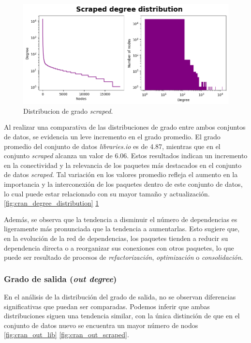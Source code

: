 \begin{figure}[h!]
    \begin{center}
        \includegraphics[width=1\textwidth]{img/cran/distribucion_grado2.png}
        \caption{Distribucion de grado \textit{scraped}.}
        \label{fig:cran_degree_distribution_scraped}
    \end{center}
\end{figure}

Al realizar una comparativa de las distribuciones de grado entre ambos conjuntos de datos,
se evidencia un leve incremento en el grado promedio. El grado promedio del conjunto de datos
\textit{libraries.io} es de 4.87, mientras que en el conjunto \textit{scraped} alcanza un valor
de 6.06. Estos resultados indican un incremento en la conectividad y la relevancia de los
paquetes más destacados en el conjunto de datos \textit{scraped}. Tal variación en los valores
promedio refleja el aumento en la importancia y la interconexión de los paquetes dentro de este
conjunto de datos, lo cual puede estar relacionado con su mayor tamaño y actualización.
\ref{fig:cran_degree_distribution} \ref{fig:cran_degree_distribution_scraped}

Además, se observa que la tendencia a disminuir el número de dependencias es ligeramente
más pronunciada que la tendencia a aumentarlas. Esto sugiere que, en la evolución de
la red de dependencias, los paquetes tienden a reducir su dependencia directa o a
reorganizar sus conexiones con otros paquetes, lo que puede ser resultado de procesos
de \textit{refactorización}, \textit{optimización} o \textit{consolidación}.


\subsubsection{Grado de salida (\textit{out degree})}


En el análisis de la distribución del grado de salida, no se observan diferencias significativas
que puedan ser comparadas. Podemos inferir que ambas distribuciones siguen una tendencia
similar, con la única distinción de que en el conjunto de datos nuevo se encuentra un mayor
número de nodos \ref{fig:cran_out_lib} \ref{fig:cran_out_scraped}.

